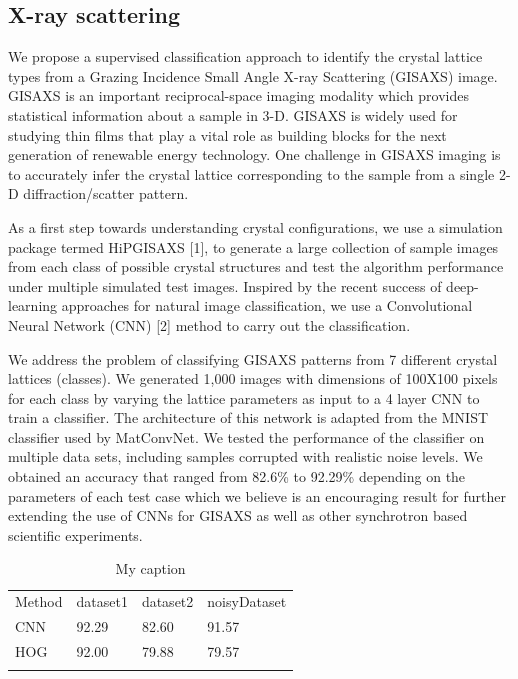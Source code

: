 \subsection{X-ray scattering}\label{subsec:scattering}
We propose a supervised classification approach to identify the crystal lattice types from a Grazing
Incidence Small Angle X-ray Scattering (GISAXS) image. GISAXS is an important reciprocal-space imaging
modality which provides statistical information about a sample in 3-D. GISAXS is widely used for
studying thin films that play a vital role as building blocks for the next generation of renewable
energy technology. One challenge in GISAXS imaging is to accurately infer the crystal lattice
corresponding to the sample from a single 2-D diffraction/scatter pattern.

As a first step towards understanding crystal configurations, we use a simulation package termed
HiPGISAXS [1], to generate a large collection of sample images from each class of possible crystal
structures and test the algorithm performance under multiple simulated test images. Inspired by the
recent success of deep-learning approaches for natural image classification, we use a Convolutional
Neural Network (CNN) [2] method to carry out the classification.

We address the problem of classifying GISAXS patterns from 7 different crystal lattices (classes). We
generated 1,000 images with dimensions of 100X100 pixels for each class by varying the lattice
parameters as input to a 4 layer CNN to train a classifier. The architecture of this network is
adapted from the MNIST classifier used by MatConvNet. We tested the performance of the classifier on
multiple data sets, including samples corrupted with realistic noise levels. We obtained an accuracy
that ranged from 82.6\% to 92.29\% depending on the parameters of each test case which we believe is
an encouraging result for further extending the use of CNNs for GISAXS as well as other synchrotron
based scientific experiments.

\begin{table}[]
\centering
\caption{My caption}
\label{my-label}
\begin{tabular}{llll}
Method & dataset1 & dataset2 & noisyDataset \\
CNN    & 92.29    & 82.60    & 91.57        \\
HOG    & 92.00    & 79.88    & 79.57        \\
       &          &          &
\end{tabular}
\end{table}

